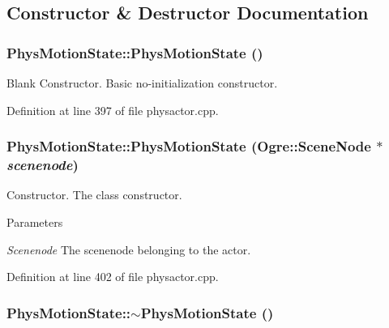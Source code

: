 \subsection{Constructor \& Destructor Documentation}
\hypertarget{classPhysMotionState_a8439c3835b9d96b0b1b285126df41a42}{
\subsubsection[{PhysMotionState}]{\setlength{\rightskip}{0pt plus 5cm}PhysMotionState::PhysMotionState ()}}
\label{d2/d14/classPhysMotionState_a8439c3835b9d96b0b1b285126df41a42}


Blank Constructor. Basic no-\/initialization constructor. 

Definition at line 397 of file physactor.cpp.\hypertarget{classPhysMotionState_a9c315b85bc405a36a6bd9d9a9f68c34a}{
\subsubsection[{PhysMotionState}]{\setlength{\rightskip}{0pt plus 5cm}PhysMotionState::PhysMotionState (Ogre::SceneNode $\ast$ {\em scenenode})}}
\label{d2/d14/classPhysMotionState_a9c315b85bc405a36a6bd9d9a9f68c34a}


Constructor. The class constructor. 
\begin{DoxyParams}{Parameters}
\item[{\em Scenenode}]The scenenode belonging to the actor. \end{DoxyParams}


Definition at line 402 of file physactor.cpp.\hypertarget{classPhysMotionState_a74441aa0ba9a1b99ee1662b2eee9db3c}{
\subsubsection[{$\sim$PhysMotionState}]{\setlength{\rightskip}{0pt plus 5cm}PhysMotionState::$\sim$PhysMotionState ()}}
\label{d2/d14/classPhysMotionState_a74441aa0ba9a1b99ee1662b2eee9db3c}


